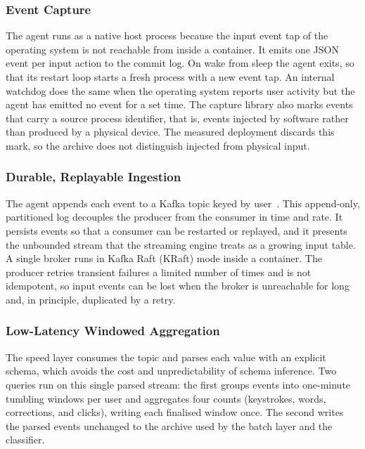 \documentclass[sensors,article,submit,pdftex,oneauthor]{Definitions/mdpi}
\begin{document}


\subsubsection{Event Capture}
The agent runs as a native host process because the input event tap of the operating system is not reachable from inside a container. It emits one JSON event per input action to the commit log. On wake from sleep the agent exits, so that its restart loop starts a fresh process with a new event tap. An internal watchdog does the same when the operating system reports user activity but the agent has emitted no event for a set time. The capture library also marks events that carry a source process identifier, that is, events injected by software rather than produced by a physical device. The measured deployment discards this mark, so the archive does not distinguish injected from physical input.

\subsubsection{Durable, Replayable Ingestion}
The agent appends each event to a Kafka topic keyed by user~\cite{kreps2011kafka}. This append-only, partitioned log decouples the producer from the consumer in time and rate. It persists events so that a consumer can be restarted or replayed, and it presents the unbounded stream that the streaming engine treats as a growing input table. A single broker runs in Kafka Raft (KRaft) mode inside a container. The producer retries transient failures a limited number of times and is not idempotent, so input events can be lost when the broker is unreachable for long and, in principle, duplicated by a retry.

\subsubsection{Low-Latency Windowed Aggregation}
The speed layer consumes the topic and parses each value with an explicit schema, which avoids the cost and unpredictability of schema inference. Two queries run on this single parsed stream: the first groups events into one-minute tumbling windows per user and aggregates four counts (keystrokes, words, corrections, and clicks), writing each finalised window once. The second writes the parsed events unchanged to the archive used by the batch layer and the classifier.
\end{document}
